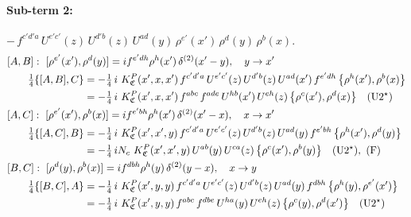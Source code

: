 \documentclass[10pt]{article}
\numberwithin{equation}{section}
\begin{document}
\paragraph{Sub-term 2:} $-\,f^{c'd'a}\,U^{e'c'}(z)\,U^{d'b}(z)\,U^{ad}(y)\,\rho^{e'}(x')\,\rho^{d}(y)\,\rho^{b}(x)$.
\begin{align}
&[A,B]:\ [\rho^{e'}(x'),\rho^{d}(y)]=i f^{e'dh}\rho^{h}(x')\,\delta^{(2)}(x'-y),\quad y\to x'\notag\\
&\qquad \tfrac14\{[A,B],C\}=-\tfrac14\,i\,\,K^{P}_{\mathfrak C}(x',x,x')\,f^{c'd'a}\,U^{e'c'}(z)\,U^{d'b}(z)\,U^{ad}(x')\,f^{e'dh}\,\big\{\rho^{h}(x'),\rho^{b}(x)\big\}\notag\\
&\qquad\phantom{\tfrac14\{[A,B],C\}}=-\tfrac14\,i\,\,K^{P}_{\mathfrak C}(x',x,x')\,f^{abc}\,f^{ade}\,U^{hb}(x')\,U^{eh}(z)\,\big\{\rho^{c}(x'),\rho^{d}(x)\big\}\quad\text{(U2$^\star$)}
\label{B:eq:GIII.VI.P-2-AB}\\
&[A,C]:\ [\rho^{e'}(x'),\rho^{b}(x)]=i f^{e'bh}\rho^{h}(x')\,\delta^{(2)}(x'-x),\quad x\to x'\notag\\
&\qquad \tfrac14\{[A,C],B\}=-\tfrac14\,i\,\,K^{P}_{\mathfrak C}(x',x',y)\,f^{c'd'a}\,U^{e'c'}(z)\,U^{d'b}(z)\,U^{ad}(y)\,f^{e'bh}\,\big\{\rho^{h}(x'),\rho^{d}(y)\big\}\notag\\
&\qquad\phantom{\tfrac14\{[A,C],B\}}=-\tfrac14\,i N_{c}\,\,K^{P}_{\mathfrak C}(x',x',y)\,U^{ab}(y)\,U^{ca}(z)\,\big\{\rho^{c}(x'),\rho^{b}(y)\big\}\quad\text{(U2$^\star$)},\ \text{(F)}
\label{B:eq:GIII.VI.P-2-AC}\\
&[B,C]:\ [\rho^{d}(y),\rho^{b}(x)]=i f^{dbh}\rho^{h}(y)\,\delta^{(2)}(y-x),\quad x\to y\notag\\
&\qquad \tfrac14\{[B,C],A\}=-\tfrac14\,i\,\,K^{P}_{\mathfrak C}(x',y,y)\,f^{c'd'a}\,U^{e'c'}(z)\,U^{d'b}(z)\,U^{ad}(y)\,f^{dbh}\,\big\{\rho^{h}(y),\rho^{e'}(x')\big\}\notag\\
&\qquad\phantom{\tfrac14\{[B,C],A\}}=-\tfrac14\,i\,\,K^{P}_{\mathfrak C}(x',y,y)\,f^{abc}\,f^{dbe}\,U^{ha}(y)\,U^{eh}(z)\,\big\{\rho^{c}(y),\rho^{d}(x')\big\}\quad\text{(U2$^\star$)}
\label{B:eq:GIII.VI.P-2-BC}
\end{align}
\end{document}
